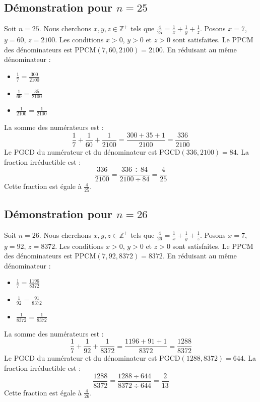 \documentclass[11pt,a4paper]{article}
\begin{document}
\subsection{Démonstration pour $n = 25$}
Soit $n = 25$. Nous cherchons $x, y, z \in \mathbb{Z}^{+}$ tels que $\frac{4}{25} = \frac{1}{x} + \frac{1}{y} + \frac{1}{z}$.
Posons $x = 7$, $y = 60$, $z = 2100$.
Les conditions $x > 0$, $y > 0$ et $z > 0$ sont satisfaites.
Le PPCM des dénominateurs est $\text{PPCM}(7, 60, 2100) = 2100$.
En réduisant au même dénominateur :
\begin{itemize}
    \item $\frac{1}{7} = \frac{300}{2100}$
    \item $\frac{1}{60} = \frac{35}{2100}$
    \item $\frac{1}{2100} = \frac{1}{2100}$
\end{itemize}
La somme des numérateurs est :
$$ \frac{1}{7} + \frac{1}{60} + \frac{1}{2100} = \frac{300 + 35 + 1}{2100} = \frac{336}{2100} $$
Le PGCD du numérateur et du dénominateur est $\text{PGCD}(336, 2100) = 84$.
La fraction irréductible est :
$$ \frac{336}{2100} = \frac{336 \div 84}{2100 \div 84} = \frac{4}{25} $$
Cette fraction est égale à $\frac{4}{25}$.

\subsection{Démonstration pour $n = 26$}
Soit $n = 26$. Nous cherchons $x, y, z \in \mathbb{Z}^{+}$ tels que $\frac{4}{26} = \frac{1}{x} + \frac{1}{y} + \frac{1}{z}$.
Posons $x = 7$, $y = 92$, $z = 8372$.
Les conditions $x > 0$, $y > 0$ et $z > 0$ sont satisfaites.
Le PPCM des dénominateurs est $\text{PPCM}(7, 92, 8372) = 8372$.
En réduisant au même dénominateur :
\begin{itemize}
    \item $\frac{1}{7} = \frac{1196}{8372}$
    \item $\frac{1}{92} = \frac{91}{8372}$
    \item $\frac{1}{8372} = \frac{1}{8372}$
\end{itemize}
La somme des numérateurs est :
$$ \frac{1}{7} + \frac{1}{92} + \frac{1}{8372} = \frac{1196 + 91 + 1}{8372} = \frac{1288}{8372} $$
Le PGCD du numérateur et du dénominateur est $\text{PGCD}(1288, 8372) = 644$.
La fraction irréductible est :
$$ \frac{1288}{8372} = \frac{1288 \div 644}{8372 \div 644} = \frac{2}{13} $$
Cette fraction est égale à $\frac{4}{26}$.
\end{document}
